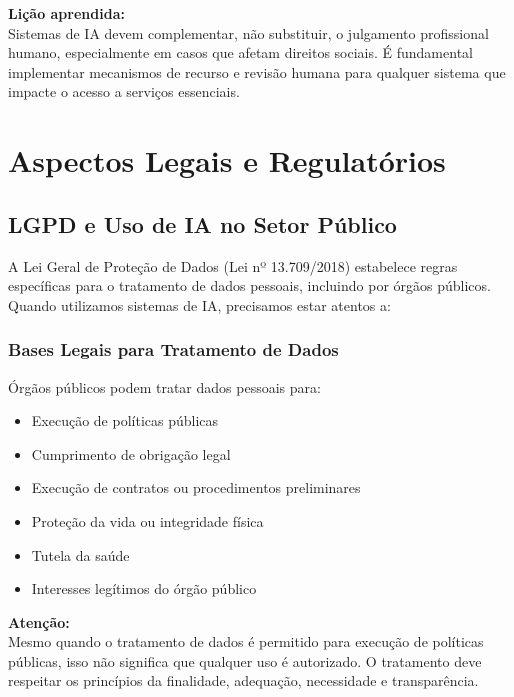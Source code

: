 \documentclass[12pt,a4paper]{article}
\begin{document}
\begin{tcolorbox}[highlight]
\textbf{Lição aprendida:} \\
Sistemas de IA devem complementar, não substituir, o julgamento profissional humano, especialmente em casos que afetam direitos sociais. É fundamental implementar mecanismos de recurso e revisão humana para qualquer sistema que impacte o acesso a serviços essenciais.
\end{tcolorbox}

\newpage
\section{Aspectos Legais e Regulatórios}

\subsection{LGPD e Uso de IA no Setor Público}

A Lei Geral de Proteção de Dados (Lei nº 13.709/2018) estabelece regras específicas para o tratamento de dados pessoais, incluindo por órgãos públicos. Quando utilizamos sistemas de IA, precisamos estar atentos a:

\subsubsection{Bases Legais para Tratamento de Dados}
Órgãos públicos podem tratar dados pessoais para:
\begin{itemize}
    \item Execução de políticas públicas
    \item Cumprimento de obrigação legal
    \item Execução de contratos ou procedimentos preliminares
    \item Proteção da vida ou integridade física
    \item Tutela da saúde
    \item Interesses legítimos do órgão público
\end{itemize}

\begin{tcolorbox}[warning]
\textbf{Atenção:} \\
Mesmo quando o tratamento de dados é permitido para execução de políticas públicas, isso não significa que qualquer uso é autorizado. O tratamento deve respeitar os princípios da finalidade, adequação, necessidade e transparência.
\end{tcolorbox}
\end{document}
